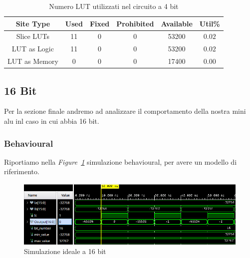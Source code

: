 \begin{table}[ht]
      \centering
      \begin{tabular}{|c|c|c|c|c|c|}
        \hline
        Site Type & Used & Fixed & Prohibited & Available & Util\% \\ \hline
        Slice LUTs & 11 & 0 & 0 & 53200 & $0.02$ \\ \hline
         LUT as Logic & 11 & 0 & 0 & 53200 & $0.02$ \\ \hline 
         LUT as Memory  & 0 & 0 & 0 & 17400 & $0.00$ \\ \hline
      \end{tabular}
      \caption{Numero LUT utilizzati nel circuito a 4 bit}
      \label{lut_utilization_8bit}
\end{table}

\clearpage
\subsection{16 Bit}
Per la sezione finale andremo ad analizzare il comportamento della nostra mini alu inl caso in cui abbia 16 bit.

\subsubsection{Behavioural}
Riportiamo nella \textit{Figure~\ref{16bit_behav}} simulazione behavioural, per avere un modello di riferimento.
\begin{figure}[ht]
  \centering
  \includegraphics[width=1\textwidth]{assets/simulations/behavioural/16bit/16bit_behav.png}
  \caption{Simulazione ideale a 16 bit}
  \label{16bit_behav}
\end{figure}
\FloatBarrier


